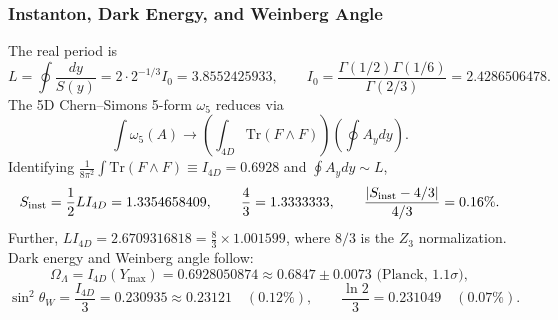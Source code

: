 \documentclass[a4paper,7pt,oneside,openany]{book}
\begin{document}
\subsubsection{Instanton, Dark Energy, and Weinberg Angle}
\label{sssec:instanton}
The real period is
\begin{equation}
L = \oint\frac{dy}{S(y)} = 2 \cdot 2^{-1/3} I_0 = 3.8552425933, \qquad I_0 = \frac{\Gamma(1/2)\Gamma(1/6)}{\Gamma(2/3)} = 2.4286506478.
\end{equation}
The 5D Chern--Simons 5-form \(\omega_5\) reduces via
\begin{equation}
\int \omega_5(A) \to \left(\int_{4D} \mathrm{Tr}(F \wedge F)\right)\left(\oint A_y dy\right).
\end{equation}
Identifying \(\frac{1}{8\pi^2}\int \mathrm{Tr}(F \wedge F) \equiv I_{4D} = 0.6928\) and \(\oint A_y dy \sim L\),
\begin{equation}
S_{\rm inst} = \frac{1}{2} L I_{4D} = 1.3354658409, \qquad \frac{4}{3} = 1.3333333, \qquad \frac{|S_{\rm inst}-4/3|}{4/3} = 0.16\%.
\label{eq:instanton}
\end{equation}
Further, \(L I_{4D} = 2.6709316818 = \frac{8}{3} \times 1.001599\), where \(8/3\) is the \(Z_3\) normalization. Dark energy and Weinberg angle follow:
\begin{equation}
\Omega_\Lambda = I_{4D}(Y_{\max}) = 0.6928050874 \approx 0.6847 \pm 0.0073 \text{ (Planck, }1.1\sigma\text{)},
\end{equation}
\begin{equation}
\sin^2\theta_W = \frac{I_{4D}}{3} = 0.230935 \approx 0.23121 \quad (0.12\%), \qquad \frac{\ln 2}{3} = 0.231049 \quad (0.07\%).
\end{equation}

\end{document}
